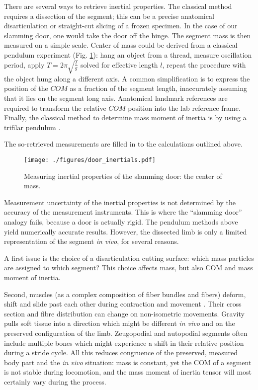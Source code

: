 \documentclass[10pt,a4paper]{article}
\begin{document}
There are several ways to retrieve inertial properties.
The classical method requires a dissection of the segment; this can be a precise anatomical disarticulation or straight-cut slicing of a frozen specimen.
In the case of our slamming door, one would take the door off the hinge.
The segment mass is then measured on a simple scale.
Center of mass could be derived from a classical pendulum experiment (Fig. \ref{fig:door_inertials}): hang an object from a thread, measure oscillation period, apply \(T=2\pi\sqrt{\frac{l}{g}}\) solved for effective length \(l\), repeat the procedure with the object hung along a different axis.
A common simplification is to express the position of the \(COM\) as a fraction of the segment length, inaccurately assuming that it lies on the segment long axis.
Anatomical landmark references are required to transform the relative \(COM\) position into the lab reference frame.
Finally, the classical method to determine mass moment of inertia is by using a trifilar pendulum \citep{Schedlinski2001,Korr1962}.

The so-retrieved measurements are filled in to the calculations outlined above.


\begin{figure}[htbp]
\centering
\texttt{[image: ./figures/door\_inertials.pdf]}
\caption{\label{fig:door_inertials}Measuring inertial properties of the slamming door: the center of mass.}
\end{figure}


Measurement uncertainty of the inertial properties is not determined by the accuracy of the measurement instruments.
This is where the ``slamming door'' analogy fails, because a door is actually rigid.
The pendulum methods above yield numerically accurate results.
However, the dissected limb is only a limited representation of the segment \emph{in vivo}, for several reasons.

A first issue is the choice of a disarticulation cutting surface: which mass particles are assigned to which segment?
This choice affects mass, but also COM and mass moment of inertia.

Second, muscles (as a complex composition of fiber bundles and fibers) deform, shift and slide past each other during contraction and movement \citep{Bol2013}.
Their cross section and fibre distribution can change on non-isometric movements.
Gravity pulls soft tissue into a direction which might be different \emph{in vivo} and on the preserved configuration of the limb.
Zeugopodial and autopodial segments often include multiple bones which might experience a shift in their relative position during a stride cycle.
All this reduces congruence of the preserved, measured body part and the \emph{in vivo} situation: mass is constant, yet the COM of a segment is not stable during locomotion, and the mass moment of inertia tensor will most certainly vary during the process.
\end{document}
